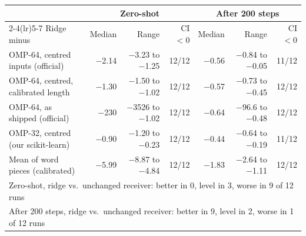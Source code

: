 \begin{tabular}{lrrrrrr}
\toprule
 & \multicolumn{3}{c}{Zero-shot} & \multicolumn{3}{c}{After 200 steps} \\
\cmidrule(lr){2-4}\cmidrule(lr){5-7}
Ridge minus & Median & Range & CI$<0$ & Median & Range & CI$<0$ \\
\midrule
OMP-64, centred inputs (official) & $-$2.14 & $-$3.23 to $-$1.25 & 12/12 & $-$0.56 & $-$0.84 to $-$0.05 & 11/12 \\
OMP-64, centred, calibrated length & $-$1.30 & $-$1.50 to $-$1.02 & 12/12 & $-$0.57 & $-$0.73 to $-$0.45 & 12/12 \\
OMP-64, as shipped (official) & $-$230 & $-$3526 to $-$1.02 & 12/12 & $-$0.64 & $-$96.6 to $-$0.48 & 12/12 \\
OMP-32, centred (our scikit-learn) & $-$0.90 & $-$1.20 to $-$0.23 & 12/12 & $-$0.44 & $-$0.64 to $-$0.19 & 11/12 \\
Mean of word pieces (calibrated) & $-$5.99 & $-$8.87 to $-$4.84 & 12/12 & $-$1.83 & $-$2.64 to $-$1.11 & 12/12 \\
\midrule
\multicolumn{7}{l}{Zero-shot, ridge vs.\ unchanged receiver: better in 0, level in 3, worse in 9 of 12 runs} \\
\multicolumn{7}{l}{After 200 steps, ridge vs.\ unchanged receiver: better in 9, level in 2, worse in 1 of 12 runs} \\
\bottomrule
\end{tabular}
